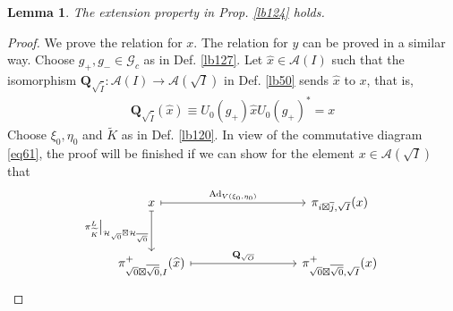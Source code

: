 \documentclass[11pt,b5paper,notitlepage]{article}
\theoremstyle{definition}
\theoremstyle{plain}
\newtheorem{lm}[df]{Lemma}
\newcommand{\wtd}{\widetilde}
\newcommand{\wht}{\widehat}
\newcommand{\ovl}{\overline}
\newcommand{\Ad}{\mathrm{Ad}}
\newcommand{\Gc}{\mathscr G_c}
\newcommand{\MA}{\mathcal A}
\newcommand{\MH}{\mathcal H}
\newcommand{\sqz}{{\sqrt 0}}
\newcommand{\Qbf}{\mathbf Q}
\numberwithin{equation}{section}
\begin{document}
\begin{lm}\label{lb136}
The extension property in Prop. \ref{lb124} holds.
\end{lm}


\begin{proof}
We prove the relation for $x$. The relation for $y$ can be proved in a similar way. Choose $g_+,g_-\in\Gc$ as in Def. \ref{lb127}. Let $\wht x\in\MA(I)$ such that the isomorphism $\Qbf_{\sqrt{\wtd I}}:\MA(I)\rightarrow\MA(\sqrt I)$ in Def. \ref{lb50} sends $\wht x$ to $x$, that is,
\begin{align*}\label{eq69}
\Qbf_{\sqrt{\wtd I}}(\wht x)\equiv U_0(g_+)\wht xU_0(g_+)^*=x \tag{$\star$}
\end{align*}
Choose $\xi_0,\eta_0$ and $\wtd K$ as in Def. \ref{lb120}. In view of the commutative diagram \eqref{eq61}, the proof will be finished if we can show for the element $x\in\MA(\sqrt I)$ that
\begin{align*}
\begin{tikzcd}[row sep=1cm,column sep=3cm, ampersand replacement=\&]
x \arrow[r,maps to,"{\Ad_{V(\xi_0,\eta_0)}}"] \arrow[d,maps to,"{\pi^L_{\wtd K}\big|_{\MH_\sqz\boxtimes\MH_{\ovl\sqz}}}"']     \& \pi_{i\boxtimes\ovl j,\sqrt I}(x) \\
\pi^+_{\sqz\boxtimes\ovl\sqz,I}(\wht x) \arrow[r,maps to,"\Qbf_{\sqrt O}"] \& \pi^+_{\sqz\boxtimes\ovl\sqz,\sqrt I}(x) %
\end{tikzcd}
\end{align*}


\end{proof}
\end{document}
